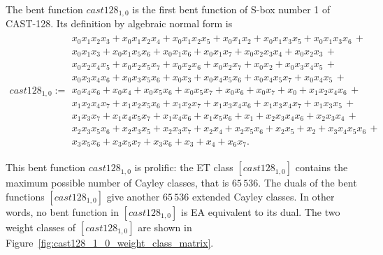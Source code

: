 The bent function $cast128_{1,0}$ is the first bent function of S-box number 1 of CAST-128.
Its definition by algebraic normal form is
\footnotesize{}
\begin{align*}
cast128_{1,0} :=
\begin{array}{l}
x_{0} x_{1} x_{2} x_{3} + x_{0} x_{1} x_{2} x_{4} + x_{0} x_{1} x_{2} x_{5} + x_{0} x_{1} x_{2} + x_{0} x_{1} x_{3} x_{5} + x_{0} x_{1} x_{3} x_{6}\, +
\\
x_{0} x_{1} x_{3} + x_{0} x_{1} x_{5} x_{6} + x_{0} x_{1} x_{6} + x_{0} x_{1} x_{7} + x_{0} x_{2} x_{3} x_{4} + x_{0} x_{2} x_{3}\, +
\\
x_{0} x_{2} x_{4} x_{5} + x_{0} x_{2} x_{5} x_{7} + x_{0} x_{2} x_{6} + x_{0} x_{2} x_{7} + x_{0} x_{2} + x_{0} x_{3} x_{4} x_{5}\, +
\\
x_{0} x_{3} x_{4} x_{6} + x_{0} x_{3} x_{5} x_{6} + x_{0} x_{3} + x_{0} x_{4} x_{5} x_{6} + x_{0} x_{4} x_{5} x_{7} + x_{0} x_{4} x_{5}\, +
\\
x_{0} x_{4} x_{6} + x_{0} x_{4} + x_{0} x_{5} x_{6} + x_{0} x_{5} x_{7} + x_{0} x_{6} + x_{0} x_{7} + x_{0} + x_{1} x_{2} x_{4} x_{6}\, +
\\
x_{1} x_{2} x_{4} x_{7} + x_{1} x_{2} x_{5} x_{6} + x_{1} x_{2} x_{7} + x_{1} x_{3} x_{4} x_{6} + x_{1} x_{3} x_{4} x_{7} + x_{1} x_{3} x_{5}\, +
\\
x_{1} x_{3} x_{7} + x_{1} x_{4} x_{5} x_{7} + x_{1} x_{4} x_{6} + x_{1} x_{5} x_{6} + x_{1} + x_{2} x_{3} x_{4} x_{6} + x_{2} x_{3} x_{4}\, +
\\
x_{2} x_{3} x_{5} x_{6} + x_{2} x_{3} x_{5} + x_{2} x_{3} x_{7} + x_{2} x_{4} + x_{2} x_{5} x_{6} + x_{2} x_{5} + x_{2} + x_{3} x_{4} x_{5} x_{6}\, +
\\
x_{3} x_{5} x_{6} + x_{3} x_{5} x_{7} + x_{3} x_{6} + x_{3} + x_{4} + x_{6} x_{7}.
\end{array}
\end{align*}
\normalsize{}

This bent function $cast128_{1,0}$ is prolific:
the ET class $[cast128_{1,0}]$ contains the maximum possible number of Cayley classes,
that is $65\,536$.
The duals of the bent functions $[cast128_{1,0}]$ give another $65\,536$ extended Cayley classes.
In other words, no bent function in $[cast128_{1,0}]$ is EA equivalent to its dual.
The two weight classes of $[cast128_{1,0}]$ are
shown in Figure~\ref{fig:cast128_1_0_weight_class_matrix}.

